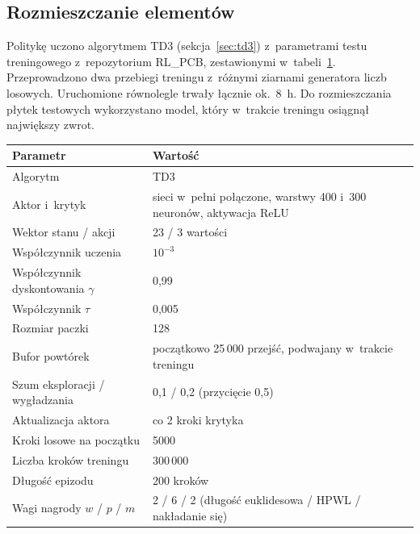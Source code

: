 \subsection{Rozmieszczanie elementów}
\label{sec:trening-rozmieszczanie}

Politykę uczono algorytmem TD3 (sekcja~\ref{sec:td3}) z~parametrami testu
treningowego z~repozytorium RL\_PCB, zestawionymi
w~tabeli~\ref{tab:trening-rl}. Przeprowadzono dwa przebiegi treningu
z~różnymi ziarnami generatora liczb losowych. Uruchomione równolegle
trwały łącznie ok.~8~h. Do rozmieszczania płytek testowych wykorzystano
model, który w~trakcie treningu osiągnął największy zwrot.

\begin{table}[ht]
\label{tab:trening-rl}
\centering\footnotesize%
\begin{tabular}{p{} p{}}
\toprule
Parametr & Wartość \\
\midrule
Algorytm & TD3 \\
\midrule
Aktor i~krytyk & sieci w~pełni połączone, warstwy 400 i~300 neuronów,
  aktywacja ReLU \\
\midrule
Wektor stanu / akcji & 23 / 3 wartości \\
\midrule
Współczynnik uczenia & $10^{-3}$ \\
\midrule
Współczynnik dyskontowania $\gamma$ & 0{,}99 \\
\midrule
Współczynnik $\tau$ & 0{,}005 \\
\midrule
Rozmiar paczki & 128 \\
\midrule
Bufor powtórek & początkowo 25\,000 przejść, podwajany w~trakcie treningu \\
\midrule
Szum eksploracji / wygładzania & 0{,}1 / 0{,}2 (przycięcie 0{,}5) \\
\midrule
Aktualizacja aktora & co 2 kroki krytyka \\
\midrule
Kroki losowe na początku & 5000 \\
\midrule
Liczba kroków treningu & 300\,000 \\
\midrule
Długość epizodu & 200 kroków \\
\midrule
Wagi nagrody $w$ / $p$ / $m$ & 2 / 6 / 2 (długość euklidesowa / HPWL /
  nakładanie się) \\
\bottomrule
\end{tabular}
\end{table}

